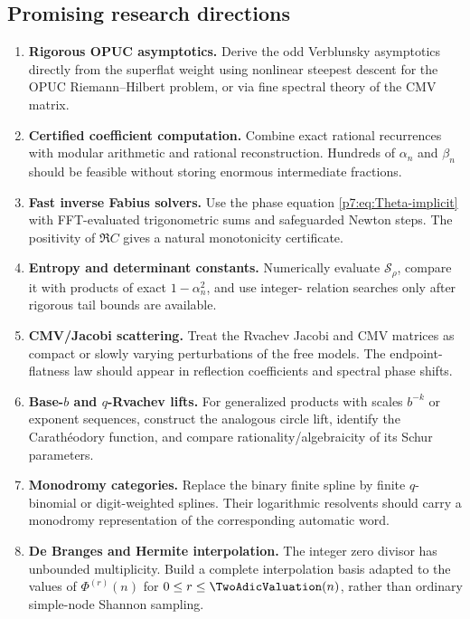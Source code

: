 \documentclass[11pt]{article}
\theoremstyle{definition}
\theoremstyle{remark}
\begin{document}
\subsection{Promising research directions}

\begin{enumerate}
\item \textbf{Rigorous OPUC asymptotics.} Derive the odd Verblunsky asymptotics directly from
the superflat weight using nonlinear steepest descent for the OPUC Riemann--Hilbert problem,
or via fine spectral theory of the CMV matrix.

\item \textbf{Certified coefficient computation.} Combine exact rational recurrences with
modular arithmetic and rational reconstruction. Hundreds of \(\alpha_n\) and \(\beta_n\)
should be feasible without storing enormous intermediate fractions.

\item \textbf{Fast inverse Fabius solvers.} Use the phase equation
\eqref{p7:eq:Theta-implicit} with FFT-evaluated trigonometric sums and safeguarded Newton steps.
The positivity of \(\Re C\) gives a natural monotonicity certificate.

\item \textbf{Entropy and determinant constants.} Numerically evaluate
\(\mathcal S_\rho\), compare it with products of exact \(1-\alpha_n^2\), and use integer-
relation searches only after rigorous tail bounds are available.

\item \textbf{CMV/Jacobi scattering.} Treat the Rvachev Jacobi and CMV matrices as compact or
slowly varying perturbations of the free models. The endpoint-flatness law should appear in
reflection coefficients and spectral phase shifts.

\item \textbf{Base-\(b\) and \(q\)-Rvachev lifts.} For generalized products with scales
\(b^{-k}\) or exponent sequences, construct the analogous circle lift, identify the
Carath\'eodory function, and compare rationality/algebraicity of its Schur parameters.

\item \textbf{Monodromy categories.} Replace the binary finite spline by finite
\(q\)-binomial or digit-weighted splines. Their logarithmic resolvents should carry a
monodromy representation of the corresponding automatic word.

\item \textbf{De Branges and Hermite interpolation.} The integer zero divisor has unbounded
multiplicity. Build a complete interpolation basis adapted to the values of
\(\Phi^{(r)}(n)\) for \(0\le r\le\TwoAdicValuation(n)\), rather than ordinary simple-node Shannon
sampling.


\end{enumerate}
\end{document}
